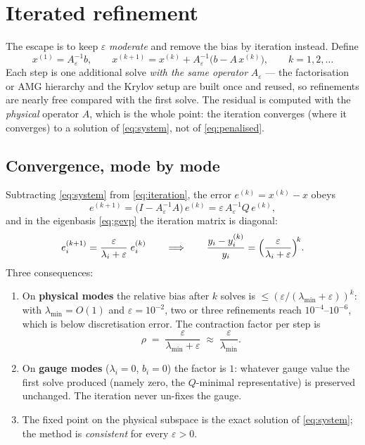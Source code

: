 \documentclass[11pt]{article}
\newcommand{\eps}{\varepsilon}
\begin{document}
\section{Iterated refinement}

The escape is to keep $\eps$ \emph{moderate} and remove the bias by
iteration instead. Define
\begin{equation}
  x^{(1)} = A_{\eps}^{-1} b, \qquad
  x^{(k+1)} = x^{(k)} + A_{\eps}^{-1}\bigl( b - A\, x^{(k)} \bigr),
  \qquad k = 1, 2, \dots
  \label{eq:iteration}
\end{equation}
Each step is one additional solve \emph{with the same operator}
$A_{\eps}$ --- the factorisation or AMG hierarchy and the Krylov setup
are built once and reused, so refinements are nearly free compared with
the first solve. The residual is computed with the \emph{physical}
operator $A$, which is the whole point: the iteration converges (where
it converges) to a solution of \eqref{eq:system}, not of
\eqref{eq:penalised}.

\subsection{Convergence, mode by mode}

Subtracting \eqref{eq:system} from \eqref{eq:iteration}, the error
$e^{(k)} = x^{(k)} - x$ obeys
\begin{equation}
  e^{(k+1)} = \bigl( I - A_{\eps}^{-1} A \bigr)\, e^{(k)}
            = \eps\, A_{\eps}^{-1} Q\, e^{(k)} ,
  \label{eq:errrec}
\end{equation}
and in the eigenbasis \eqref{eq:gevp} the iteration matrix is diagonal:
\begin{equation}
  e^{(k+1)}_{i} = \frac{\eps}{\lambda_{i} + \eps}\; e^{(k)}_{i}
  \qquad\Longrightarrow\qquad
  \frac{y_{i} - y^{(k)}_{i}}{y_{i}}
    = \Bigl( \frac{\eps}{\lambda_{i} + \eps} \Bigr)^{\!k} .
  \label{eq:contraction}
\end{equation}
Three consequences:
\begin{enumerate}
\item On \textbf{physical modes} the relative bias after $k$ solves is
  $\le (\eps/(\lambda_{\min}+\eps))^{k}$: with
  $\lambda_{\min} = O(1)$ and $\eps = 10^{-2}$, two or three
  refinements reach $10^{-4}$--$10^{-6}$, which is below discretisation
  error. The contraction factor per step is
  \begin{equation}
    \rho \;=\; \frac{\eps}{\lambda_{\min} + \eps}
    \;\approx\; \frac{\eps}{\lambda_{\min}} .
    \label{eq:rho}
  \end{equation}
\item On \textbf{gauge modes} ($\lambda_{i} = 0$, $b_{i} = 0$) the
  factor is $1$: whatever gauge value the first solve produced (namely
  zero, the $Q$-minimal representative) is preserved unchanged. The
  iteration never un-fixes the gauge.
\item The fixed point on the physical subspace is the exact solution of
  \eqref{eq:system}; the method is \emph{consistent} for every
  $\eps > 0$.
\end{enumerate}
\end{document}

